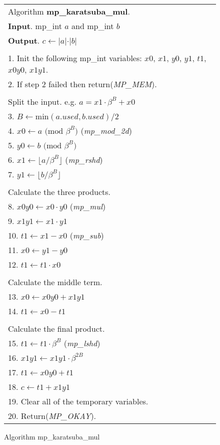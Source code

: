 \documentclass[b5paper]{book}
\begin{document}
\newpage\begin{figure}[!here]
\begin{small}
\begin{center}
\begin{tabular}{l}
\hline Algorithm \textbf{mp\_karatsuba\_mul}. \\
\textbf{Input}.   mp\_int $a$ and mp\_int $b$ \\
\textbf{Output}.  $c \leftarrow \vert a \vert \cdot \vert b \vert$ \\
\hline \\
1.  Init the following mp\_int variables: $x0$, $x1$, $y0$, $y1$, $t1$, $x0y0$, $x1y1$.\\
2.  If step 2 failed then return(\textit{MP\_MEM}). \\
\\
Split the input.  e.g. $a = x1 \cdot \beta^B + x0$ \\
3.  $B \leftarrow \mbox{min}(a.used, b.used)/2$ \\
4.  $x0 \leftarrow a \mbox{ (mod }\beta^B\mbox{)}$ (\textit{mp\_mod\_2d}) \\
5.  $y0 \leftarrow b \mbox{ (mod }\beta^B\mbox{)}$ \\
6.  $x1 \leftarrow \lfloor a / \beta^B \rfloor$ (\textit{mp\_rshd}) \\
7.  $y1 \leftarrow \lfloor b / \beta^B \rfloor$ \\
\\
Calculate the three products. \\
8.  $x0y0 \leftarrow x0 \cdot y0$ (\textit{mp\_mul}) \\
9.  $x1y1 \leftarrow x1 \cdot y1$ \\
10.  $t1 \leftarrow x1 - x0$ (\textit{mp\_sub}) \\
11.  $x0 \leftarrow y1 - y0$ \\
12.  $t1 \leftarrow t1 \cdot x0$ \\
\\
Calculate the middle term. \\
13.  $x0 \leftarrow x0y0 + x1y1$ \\
14.  $t1 \leftarrow x0 - t1$ \\
\\
Calculate the final product. \\
15.  $t1 \leftarrow t1 \cdot \beta^B$ (\textit{mp\_lshd}) \\
16.  $x1y1 \leftarrow x1y1 \cdot \beta^{2B}$ \\
17.  $t1 \leftarrow x0y0 + t1$ \\
18.  $c \leftarrow t1 + x1y1$ \\
19.  Clear all of the temporary variables. \\
20.  Return(\textit{MP\_OKAY}).\\
\hline 
\end{tabular}
\end{center}
\end{small}
\caption{Algorithm mp\_karatsuba\_mul}
\end{figure}
\end{document}
